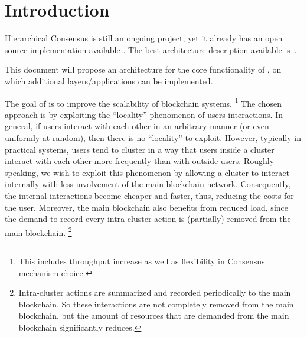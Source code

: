 \section{Introduction}
\label{sec:intro}

Hierarchical Consensus is still an ongoing project, yet it already has an open source implementation available \cite{HCgit}.
The best architecture description available is~\cite{de2022hierarchical}.

This document will propose an architecture for the core functionality of \hc, on which additional layers/applications can be implemented.



The goal of \hc{} is to improve the scalability of blockchain systems.%
\footnote{This includes throughput increase as well as flexibility in Consensus mechanism choice.}
The chosen approach is by exploiting the ``locality'' phenomenon of users interactions.
In general, if users interact with each other in an arbitrary manner (or even uniformly at random), then there is no ``locality'' to exploit.
However, typically in practical systems, users tend to cluster in a way that users inside a cluster interact with each other more frequently than with outside users.
Roughly speaking, we wish to exploit this phenomenon by allowing a cluster to interact internally with less involvement of the main blockchain network.
Consequently, the internal interactions become cheaper and faster, thus, reducing the costs for the user. 
Moreover, the main blockchain also benefits from reduced load, since the demand to record every intra-cluster action is (partially) removed from the main blockchain.%
\footnote{Intra-cluster actions are summarized and recorded periodically to the main blockchain. So these interactions are not completely removed from the main blockchain, but the amount of resources that are demanded from the main blockchain significantly reduces.}

